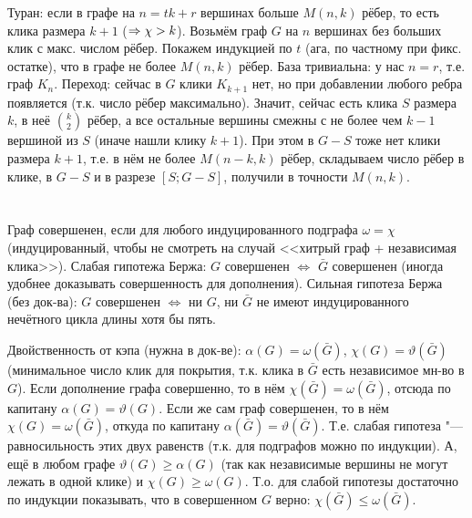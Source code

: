 	Туран: если в графе на $n=tk+r$ вершинах больше $M(n, k)$ рёбер, то есть клика размера $k+1$ ($\Rightarrow \chi>k$).
	Возьмём граф $G$ на $n$ вершинах без больших клик с макс. числом рёбер.
	Покажем индукцией по $t$ (ага, по частному при фикс. остатке), что в графе не более $M(n,k)$ рёбер.
	База тривиальна: у нас $n=r$, т.е. граф $K_n$.
	Переход: сейчас в $G$ клики $K_{k+1}$ нет, но при добавлении любого ребра появляется (т.к. число рёбер максимально).
	Значит, сейчас есть клика $S$ размера $k$, в неё $\binom{k}{2}$ рёбер, а все остальные вершины смежны с не более чем $k-1$ вершиной из $S$ (иначе нашли клику $k+1$).
	При этом в $G-S$ тоже нет клики размера $k+1$, т.е. в нём не более $M(n-k,k)$ рёбер, складываем число рёбер в клике, в $G-S$ и в разрезе $[S;G-S]$, получили в точности $M(n,k)$.

\section{} %
	Граф совершенен, если для любого индуцированного подграфа $\omega=\chi$ (индуцированный, чтобы не смотреть на случай <<хитрый граф + независимая клика>>).
	Слабая гипотежа Бержа: $G$ совершенен $\iff$ $\bar G$ совершенен (иногда удобнее доказывать совершенность для дополнения).
	Сильная гипотеза Бержа (без док-ва): $G$ совершенен $\iff$ ни $G$, ни $\bar G$ не имеют индуцированного нечётного цикла длины хотя бы пять.

	Двойственность от кэпа (нужна в док-ве): $\alpha(G)=\omega(\bar G)$, $\chi(G)=\vartheta(\bar G)$ (минимальное число клик для покрытия, т.к. клика в $\bar G$ есть независимое мн-во в $G$).
	Если дополнение графа совершенно, то в нём $\chi(\bar G)=\omega(\bar G)$, отсюда по капитану $\alpha(G)=\vartheta(G)$.
	Если же сам граф совершенен, то в нём $\chi(G)=\omega(\bar G)$, откуда по капитану $\alpha(\bar G)=\vartheta(\bar G)$.
	Т.е. слабая гипотеза "--- равносильность этих двух равенств (т.к. для подграфов можно по индукции).
	А, ещё в любом графе $\vartheta(G)\ge \alpha(G)$ (так как независимые вершины не могут лежать в одной клике) и $\chi(G)\ge \omega(G)$.
	Т.о. для слабой гипотезы достаточно по индукции показывать, что в совершенном $G$ верно: $\chi(\bar G) \le \omega(\bar G)$.

